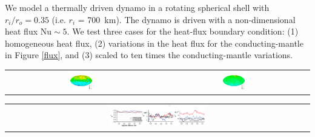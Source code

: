 \documentclass[landscape,a0b,final]{a0poster}
\begin{document}
\begin{multicols}{3}
We model a thermally driven dynamo in a rotating spherical shell with $r_{i}/r_{o} =
0.35$ (i.e.  $r_i$ = 700~km).  The dynamo is driven with a non-dimensional heat flux
$\mathrm{Nu} \sim 5$.  We test three cases for the heat-flux boundary condition: (1)
homogeneous heat flux, (2) variations in the heat flux for the conducting-mantle in
Figure \ref{flux}, and (3) scaled to ten times the conducting-mantle variations.
\begin{center}
\begin{tabular}{cc}
 \includegraphics[width=0.16\textwidth]{br_cmb_x0.png} &
 \includegraphics[width=0.16\textwidth]{br_cmb_x10.png}
\end{tabular}
\label{dynamo}
\end{center}

\begin{center}
\begin{tabular}{c}
 \includegraphics[width=0.32\textwidth]{coeff_flat.png} 
\end{tabular}
\label{gauss}
\end{center}



\end{multicols}
\end{document}
